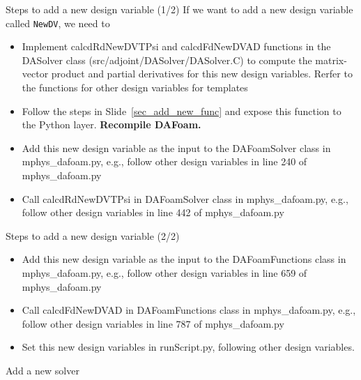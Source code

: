\documentclass{bredelebeamer}
\begin{document}
\begin{frame}[fragile]{Steps to add a new design variable (1/2)}
If we want to add a new design variable called \texttt{NewDV}, we need to
\begin{itemize}
  \setlength\itemsep{0.5em}
 \item Implement calcdRdNewDVTPsi and calcdFdNewDVAD functions in the DASolver class (src/adjoint/DASolver/DASolver.C) to compute the matrix-vector product and partial derivatives for this new design variables. Rerfer to the functions for other design variables for templates
 \item Follow the steps in Slide~\ref{sec_add_new_func} and expose this function to the Python layer. \textbf{Recompile DAFoam.}
 \item Add this new design variable as the input to the DAFoamSolver class in mphys\_dafoam.py, e.g., follow other design variables in line 240 of mphys\_dafoam.py
 \item Call calcdRdNewDVTPsi in DAFoamSolver class in mphys\_dafoam.py, e.g., follow other design variables in line 442 of mphys\_dafoam.py
\end{itemize}
\end{frame}

\begin{frame}[fragile]{Steps to add a new design variable (2/2)}
\begin{itemize}
    \setlength\itemsep{0.5em}
   \item Add this new design variable as the input to the DAFoamFunctions class in mphys\_dafoam.py, e.g., follow other design variables in line 659 of mphys\_dafoam.py
   \item Call calcdFdNewDVAD in DAFoamFunctions class in mphys\_dafoam.py, e.g., follow other design variables in line 787 of mphys\_dafoam.py
   \item Set this new design variables in runScript.py, following other design variables. 
\end{itemize}
\end{frame}


\begin{frame}{}
  \center \Large Add a new solver
\end{frame}
\end{document}
